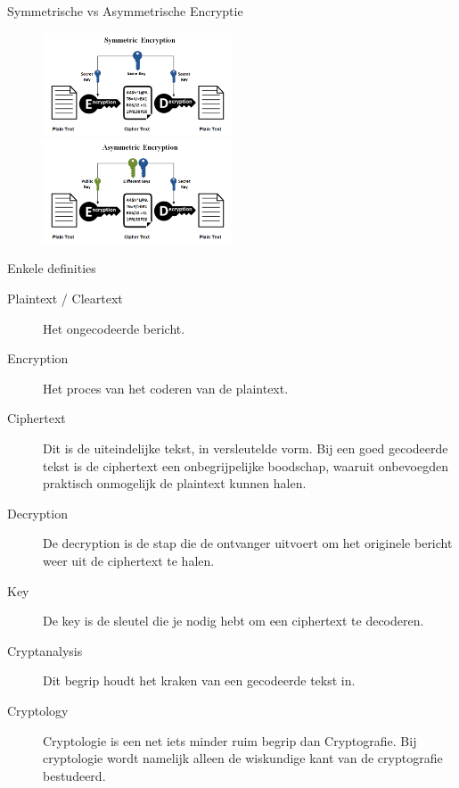 \documentclass{beamer}
\begin{document}
\begin{frame}{Symmetrische vs Asymmetrische Encryptie}
\begin{figure}
	\includegraphics[width=0.50\textwidth]{img/Symmetric-Encryption.png}
	\quad
	\includegraphics[width=0.50\textwidth]{img/Asymmetric-Encryption.png}
\end{figure}
\end{frame}

\begin{frame}{Enkele definities}
	\begin{description}
		\item[Plaintext / Cleartext] Het ongecodeerde bericht. 
			
		\item[Encryption] Het proces van het coderen van de plaintext.
		\item[Ciphertext] 
		
		Dit is de uiteindelijke tekst, in versleutelde vorm. Bij een goed gecodeerde tekst is de ciphertext een onbegrijpelijke boodschap, waaruit onbevoegden praktisch onmogelijk de plaintext kunnen halen.
		\item[Decryption] 
		
		De decryption is de stap die de ontvanger uitvoert om het originele bericht weer uit de ciphertext te halen. 
		\item[Key] 
		
		De key is de sleutel die je nodig hebt om een ciphertext te decoderen. 
		\item[Cryptanalysis] 
		Dit begrip houdt het kraken van een gecodeerde tekst in. 
		\item[Cryptology] 
		Cryptologie is een net iets minder ruim begrip dan Cryptografie. Bij cryptologie wordt namelijk alleen de wiskundige kant van de cryptografie bestudeerd.
	\end{description}
\end{frame}
\end{document}
